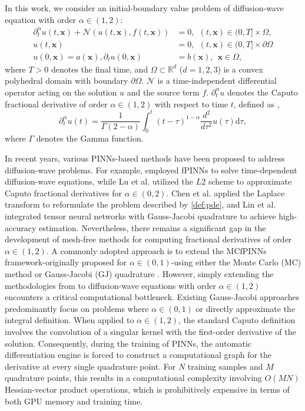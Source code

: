 \documentclass[preprint,3p,times]{elsarticle}
\def\al{\alpha}
\def\x{\mathbf{x}}
\def\N{\mathcal{N}}
\def\al{\alpha}
\def\dta{\partial_t^\alpha}
\def\d{\mathrm{d}}
\begin{document}
In this work, we consider an initial-boundary value problem of diffusion-wave equation with order $\alpha \in (1, 2)$:
\begin{equation}
    \label{def:pde}
    \begin{aligned}
        \dta u(t,\x) + \N(u(t,\x),f(t,\x)) &= 0,~~ (t,\x)\in (0,T]\times\Omega,\\
        u(t,\x)&=0,~~(t,\x)\in(0,T]\times\partial\Omega\\
        u(0,\x)=a(\x),\partial_tu(0,\x)&=b(\x), ~~\x\in\Omega,
    \end{aligned}
\end{equation}
where $T>0$ denotes the final time, and $\Omega\subset\mathbb{R}^d$ ($d=1,2,3$) is a convex polyhedral domain with boundary $\partial\Omega$. $\N$ is a time-independent differential operator acting on the solution $u$ and the source term $f$. $\dta u $ denotes the Caputo fractional derivative of order $\al \in (1, 2)$ with respect to time $t$, defined as \cite[P. 70]{Kilbas2006},
\begin{equation}
    \label{def:dtal}
    \dta u(t) = \frac{1}{\Gamma(2-\al)}\int_0^t (t-\tau)^{1-\al}\frac{d^2}{d\tau^2} u(\tau)\d\tau,
\end{equation}
where $\Gamma$ denotes the Gamma function.

In recent years, various PINNs-based methods have been proposed to address diffusion-wave problems. For example, \cite{Vats2024} employed fPINNs to solve time-dependent diffusion-wave equations, while Lu et al. \cite{Lu2025} utilized the $L2$ scheme to approximate Caputo fractional derivatives for $\alpha\in(0,2)$. Chen et al. \cite{Chen2025} applied the Laplace transform to reformulate the problem described by \eqref{def:pde}, and Lin et al. \cite{Lin2025} integrated tensor neural networks with Gauss-Jacobi quadrature to achieve high-accuracy estimation. Nevertheless, there remains a significant gap in the development of mesh-free methods for computing fractional derivatives of order $\alpha \in (1, 2)$. A commonly adopted approach is to extend the MCfPINNs framework-originally proposed for $\alpha\in(0,1)$-using either the Monte Carlo (MC) method \cite{Guo2022:MCfPINN} or Gauss-Jacobi (GJ) quadrature \cite{Hu2024:CMAME}.  However, simply extending the methodologies from \cite{Hu2024:CMAME,Lin2025} to diffusion-wave equations with order $\alpha \in (1, 2)$ encounters a critical computational bottleneck. Existing Gauss-Jacobi approaches \cite{Hu2024:CMAME,Lin2025} predominantly focus on problems where $\alpha \in (0, 1)$ or directly approximate the integral definition. When applied to $\alpha \in (1, 2)$, the standard Caputo definition involves the convolution of a singular kernel with the first-order derivative of the solution. Consequently, during the training of PINNs, the automatic differentiation engine is forced to construct a computational graph for the derivative at every single quadrature point. For $N$ training samples and $M$ quadrature points, this results in a computational complexity involving $O(MN)$ Hessian-vector product operations, which is prohibitively expensive in terms of both GPU memory and training time.
\end{document}
